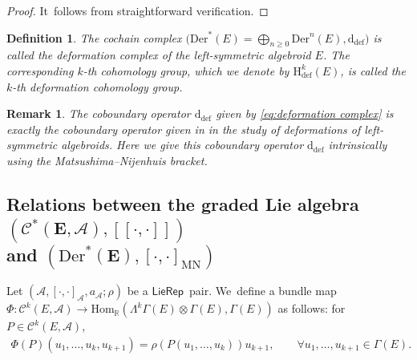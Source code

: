 \documentclass[pdftex]{sigma}%
\numberwithin{equation}{section}
\newtheorem{rmk}[thm]{Remark}
\newtheorem{defi}[thm]{Definition}
\newcommand{\Real}{\mathbb R}
\newcommand{\huaA}{\mathcal{A}}
\newcommand{\huaC}{\mathcal{C}}
\newcommand{\Courant}[1]{\left[\!\left[ #1\right]\!\right]}
\newcommand{\dM}{\mathrm{d}}
\newcommand{\Hom}{\mathrm{Hom}}
\newcommand{\Der}{\mathrm{Der}}
\newcommand{\Hi}{\mathrm{H}}
\newcommand{\MN}{\mathrm{MN}}
\newcommand{\Def}{\mathrm{def}}
\newcommand{\LP}{$\mathsf{LieRep}$~}
\begin{document}
\begin{proof}
 It~follows from straightforward verification.
\end{proof}

\begin{defi}
The cochain complex $\big(\Der^*(E)=\bigoplus _{n\geq 0}\Der^n(E),\dM_{\Def}\big)$ is called
the {\it deformation complex} of the left-symmetric algebroid $E$. The corresponding $k$-th cohomology group, which we denote by $\Hi_{\Def}^k(E)$, is called the {\it $k$-th deformation cohomology group}.
\end{defi}

\begin{rmk}
 The coboundary operator $\dM_{\Def}$ given by \eqref{eq:deformation complex} is exactly the coboundary operator given in \cite{LiuShengBaiChen} in the study of deformations of left-symmetric algebroids. Here we give this coboundary operator $\dM_{\Def}$ intrinsically using the Matsushima--Nijenhuis bracket.
\end{rmk}



\subsection[Relations between the graded Lie algebra \protect{$(C\textasciicircum{}*(E,A),[[cdot,cdot]])$} and \protect{$(Der\textasciicircum{}*(E),[cdot,cdot]\_\{MN\})$}]
{Relations between the graded Lie algebra $\boldsymbol{(\huaC^*(E,\huaA),\Courant{\cdot,\cdot})}$\\ and $\boldsymbol{(\Der^*(E),[\cdot,\cdot]_{\MN})}$}



Let $(\huaA,[\cdot,\cdot]_\huaA,a_\huaA;\rho)$ be a \LP pair. We~define a bundle map $\Phi\colon \huaC^{k}(E,\huaA)\rightarrow \Hom_\Real(\Lambda^{k}\Gamma(E)\otimes
\Gamma(E),\Gamma(E))$ as follows: for $P\in\huaC^{k}(E,\huaA)$,
\begin{gather}\label{ex:MC-eleven}
\Phi(P)(u_1,\dots,u_k,u_{k+1})=\rho(P(u_1,\dots,u_k))u_{k+1}, \qquad
\forall u_1,\dots,u_{k+1}\in\Gamma(E).
\end{gather}
\end{document}
